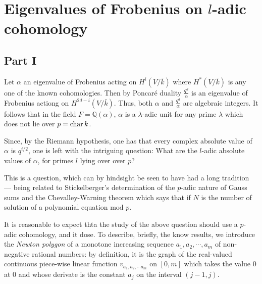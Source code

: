 \section{Eigenvalues of Frobenius on $l$-adic cohomology}
\subsection{Part I}
	Let $\alpha$ an eigenvalue of Frobenius acting on $H^i(V/\bar{k})$ where $H^*(V/\bar{k})$ is any one of the known cohomologies. Then by Poncar\'e duality $\frac{q^d}{\alpha}$ is an eigenvalue of Frobenius actiong on $H^{2d-i}(V/\bar{k})$. Thus, both $\alpha$ and $\frac{q^d}{\alpha}$ are algebraic integers. It follows that in the field $F= \mathbb{Q}(\alpha)$, $\alpha$ is a $\lambda$-adic unit for any prime $\lambda$ which does not lie over $p= \operatorname{char} k$.
	
	Since, by the Riemann hypothesis, one has that every complex absolute value of $\alpha$ is $q^{i/2}$, one is left with the intriguing question: What are the $l$-adic absolute values of $\alpha$, for primes $l$ lying over over $p$?
	
	This is a question, which can by hindsight be seen to have had a long tradition --- being related to Stickelberger's determination of the $p$-adic nature of Gauss sums and the Chevalley-Warning theorem which says that if $N$ is the number of solution of a polynomial equation $\text{mod } p$.
	
	It is reasonable to expect thta the study of the above question should use a $p$-adic cohomology, and it dose. To describe, briefly, the know results, we introduce the \emph{Newton polygon} of a monotone increasing sequence $a_1, a_2, \cdots, a_m$ of non-negative rational numbers: by definition, it is the graph of the real-valued continuous piece-wise linear function $v_{a_1, a_2, \cdots a_m}$ on $[0,m]$ which takes the value $0$ at $0$ and whose derivate is the constant $a_j$ on the interval $(j-1,j)$.
		
